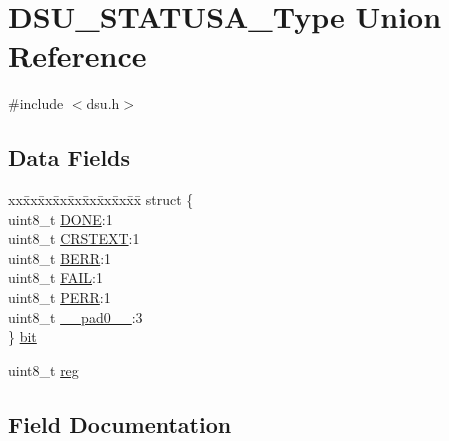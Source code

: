 \hypertarget{union_d_s_u___s_t_a_t_u_s_a___type}{}\section{D\+S\+U\+\_\+\+S\+T\+A\+T\+U\+S\+A\+\_\+\+Type Union Reference}
\label{union_d_s_u___s_t_a_t_u_s_a___type}


{\ttfamily \#include $<$dsu.\+h$>$}

\subsection*{Data Fields}
\begin{DoxyCompactItemize}
\item 
\begin{tabbing}
xx\=xx\=xx\=xx\=xx\=xx\=xx\=xx\=xx\=\kill
struct \{\\
\>uint8\_t \mbox{\hyperlink{union_d_s_u___s_t_a_t_u_s_a___type_a295c2c25da3e0e18cc0cbc3183eca78b}{DONE}}:1\\
\>uint8\_t \mbox{\hyperlink{union_d_s_u___s_t_a_t_u_s_a___type_af9d195a1c78e470049421a77e45be4b6}{CRSTEXT}}:1\\
\>uint8\_t \mbox{\hyperlink{union_d_s_u___s_t_a_t_u_s_a___type_aeab82c88ce67ca69cc642d276ca635a8}{BERR}}:1\\
\>uint8\_t \mbox{\hyperlink{union_d_s_u___s_t_a_t_u_s_a___type_a04c9f40b75c1bd1e983e8f193dd03202}{FAIL}}:1\\
\>uint8\_t \mbox{\hyperlink{union_d_s_u___s_t_a_t_u_s_a___type_abb41b7932a36f56f81f4531b37cbd1d1}{PERR}}:1\\
\>uint8\_t \mbox{\hyperlink{union_d_s_u___s_t_a_t_u_s_a___type_a8b4eebe79ded0459acec2f4950102ba3}{\_\_pad0\_\_}}:3\\
\} \mbox{\hyperlink{union_d_s_u___s_t_a_t_u_s_a___type_a65532ce95fdfd23b17bffae2f8df36da}{bit}}\\

\end{tabbing}\item 
uint8\+\_\+t \mbox{\hyperlink{union_d_s_u___s_t_a_t_u_s_a___type_a9428adc9af4653a2050e2536b55dec8d}{reg}}
\end{DoxyCompactItemize}


\subsection{Field Documentation}
\mbox{\label{union_d_s_u___s_t_a_t_u_s_a___type_a8b4eebe79ded0459acec2f4950102ba3}} 
